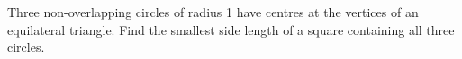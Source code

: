 Three non-overlapping circles of radius 1 have centres at the vertices of an equilateral triangle. Find the smallest side length of a square containing all three circles.
